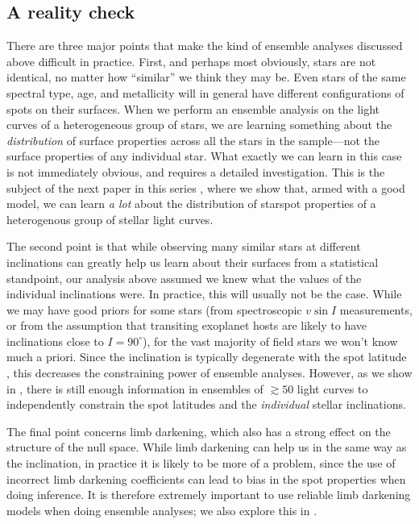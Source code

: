 \documentclass[modern,linenumbers]{aastex62}
\begin{document}
\subsection{A reality check}
\label{sec:reality-check}

There are three major points that make the kind of ensemble
analyses discussed above difficult in practice. First, and perhaps
most obviously, stars are
not identical, no matter how ``similar'' we think they may be.
Even stars of the same spectral type, age, and metallicity will
in general have different configurations of spots on their surfaces.
When we perform an ensemble analysis on the light curves of a
heterogeneous group of stars, we are learning something about the
\emph{distribution} of surface properties across all the stars in
the sample---not the surface properties of any individual star.
What exactly we can learn in this case is not immediately obvious,
and requires a detailed investigation. This is the subject of
the next paper in this series , where we show that,
armed with a good model,
we can learn \emph{a lot} about the distribution of starspot
properties of a heterogenous group of stellar light curves.

The second point is that while observing many similar stars at different
inclinations can greatly help us learn about their surfaces from a
statistical standpoint, our analysis
above assumed we knew what the values of the individual inclinations were.
In practice, this will usually not be the case. While we may have
good priors for some stars (from spectroscopic $v\sin I$ measurements,
or from the assumption that transiting exoplanet hosts are likely
to have inclinations close to $I=90^\circ$), for the vast majority
of field stars we won't know much a priori. Since the inclination
is typically degenerate with the spot latitude \citep[e.g.,][]{Walkowicz2013},
this decreases the constraining power of ensemble analyses.
However, as we show in , there is still enough
information in ensembles of $\gtrsim 50$ light curves
to independently constrain the spot latitudes
and the \emph{individual} stellar inclinations.

The final point concerns limb darkening, which also has a strong
effect on the structure of the null space. While limb darkening can
help us in the same way as the inclination, in practice it is likely to be more
of a problem, since the use of incorrect limb darkening coefficients can lead
to bias in the spot properties when doing inference.
It is therefore extremely important to use reliable limb darkening models
when doing ensemble analyses; we also explore this in .
\end{document}
